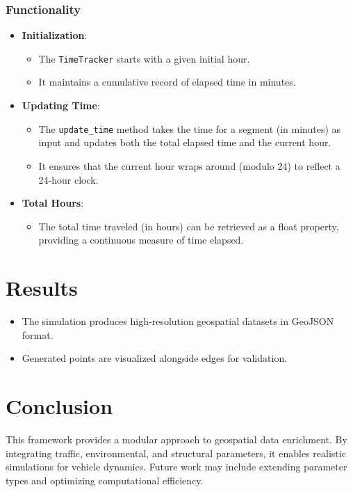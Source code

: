 \documentclass[a4paper,UKenglish,cleveref, autoref, thm-restate]{lipics-v2021}
\begin{document}
\subsubsection{Functionality}
\begin{itemize}
    \item \textbf{Initialization}:
    \begin{itemize}
        \item The \texttt{TimeTracker} starts with a given initial hour.
        \item It maintains a cumulative record of elapsed time in minutes.
    \end{itemize}

    \item \textbf{Updating Time}:
    \begin{itemize}
        \item The \texttt{update\_time} method takes the time for a segment (in minutes) as input and updates both the total elapsed time and the current hour.
        \item It ensures that the current hour wraps around (modulo 24) to reflect a 24-hour clock.
    \end{itemize}

    \item \textbf{Total Hours}:
    \begin{itemize}
        \item The total time traveled (in hours) can be retrieved as a float property, providing a continuous measure of time elapsed.
    \end{itemize}
\end{itemize}

\section{Results}
\begin{itemize}
    \item The simulation produces high-resolution geospatial datasets in GeoJSON format.
    \item Generated points are visualized alongside edges for validation.
\end{itemize}

\section{Conclusion}
This framework provides a modular approach to geospatial data enrichment. By integrating traffic, environmental, and structural parameters, it enables realistic simulations for vehicle dynamics. Future work may include extending parameter types and optimizing computational efficiency.







\appendix
\end{document}
